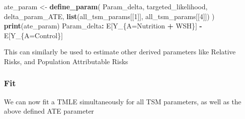 \documentclass[12pt, krantz2,]{krantz}
\newenvironment{Shaded}{\begin{snugshade}}{\end{snugshade}}
\newcommand{\DecValTok}[1]{\textcolor[rgb]{0.06,0.06,0.06}{#1}}
\newcommand{\KeywordTok}[1]{\textcolor[rgb]{0.27,0.27,0.27}{\textbf{#1}}}
\newcommand{\NormalTok}[1]{#1}
\newcommand{\OperatorTok}[1]{\textcolor[rgb]{0.43,0.43,0.43}{\textbf{#1}}}
\newcommand{\StringTok}[1]{\textcolor[rgb]{0.5,0.5,0.5}{#1}}
\theoremstyle{definition}
\theoremstyle{definition}
\theoremstyle{definition}
\newcommand{\1}{\mathbbm{1}}
\begin{document}
\begin{Shaded}
\begin{Highlighting}[]
\NormalTok{ate_param <-}\StringTok{ }\KeywordTok{define_param}\NormalTok{(}
\NormalTok{  Param_delta, targeted_likelihood,}
\NormalTok{  delta_param_ATE,}
  \KeywordTok{list}\NormalTok{(all_tsm_params[[}\DecValTok{1}\NormalTok{]], all_tsm_params[[}\DecValTok{4}\NormalTok{]])}
\NormalTok{)}
\KeywordTok{print}\NormalTok{(ate_param)}
\NormalTok{Param_delta}\OperatorTok{:}\StringTok{ }\NormalTok{E[Y_\{A=Nutrition }\OperatorTok{+}\StringTok{ }\NormalTok{WSH\}] }\OperatorTok{-}\StringTok{ }\NormalTok{E[Y_\{A=Control\}]}
\end{Highlighting}
\end{Shaded}

This can similarly be used to estimate other derived parameters like Relative
Risks, and Population Attributable Risks

\hypertarget{fit}{%
\subsubsection{Fit}\label{fit}}

We can now fit a TMLE simultaneously for all TSM parameters, as well as the
above defined ATE parameter
\end{document}
